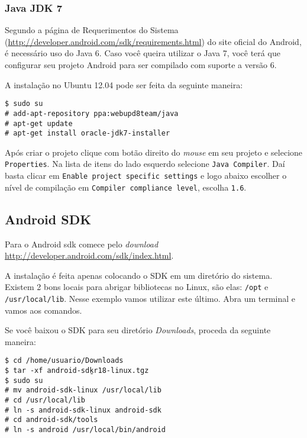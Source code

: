 \subsubsection{Java JDK 7}

Segundo a página de Requerimentos do Sistema (\url{http://developer.android.com/sdk/requirements.html})
do site oficial do Android, é necessário uso do Java 6. Caso você queira utilizar o Java 7, você
terá que configurar seu projeto Android para ser compilado com suporte a versão 6.

A instalação no Ubuntu 12.04 pode ser feita da seguinte maneira:

\begin{flushleft}\texttt{\$ sudo su\\
\# add-apt-repository ppa:webupd8team/java\\
\# apt-get update\\
\# apt-get install oracle-jdk7-installer\\}
\end{flushleft}

Após criar o projeto clique com botão direito do \textit{mouse} em seu projeto e selecione
\texttt{Properties}. Na lista de itens do lado esquerdo selecione \texttt{Java Compiler}. Daí basta clicar
em \texttt{Enable project specific settings} e logo abaixo escolher o nível de compilação em
\texttt{Compiler compliance level}, escolha \texttt{1.6}.

\subsection{Android SDK \label{ssec:sdk}}

Para o Android \gls{sdk} comece pelo \textit{download} \url{http://developer.android.com/sdk/index.html}.

A instalação é feita apenas colocando o SDK em um diretório do sistema. Existem 2 bons locais para
abrigar bibliotecas no Linux, são elas: \texttt{/opt} e \texttt{/usr/local/lib}. Nesse exemplo vamos
utilizar este último. Abra um terminal e vamos aos comandos.

Se você baixou o SDK para seu diretório \textit{Downloads}, proceda da seguinte maneira:

\medskip

\begin{flushleft}
\texttt{\$ cd /home/usuario/Downloads \\
\$ tar -xf android-sdk\b{ }r18-linux.tgz \\
\$ sudo su \\
\# mv android-sdk-linux /usr/local/lib \\
\# cd /usr/local/lib \\
\# ln -s android-sdk-linux android-sdk \\
\# cd android-sdk/tools \\
\# ln -s android /usr/local/bin/android \\
}
\end{flushleft}


